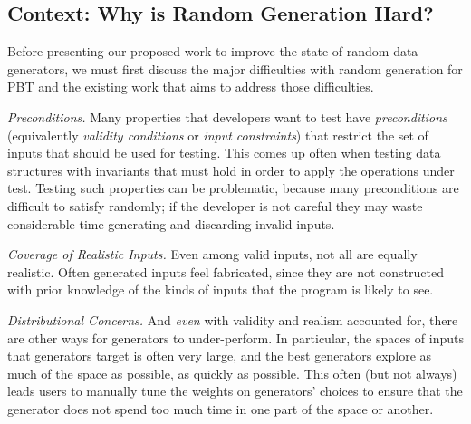 \subsection*{Context: Why is Random Generation Hard?}%
Before presenting our proposed work to improve the state of random data
generators, we must first discuss the major difficulties with random generation
for PBT and the existing work that aims to address those difficulties.


{\em Preconditions.}
Many properties that developers want to test have {\em preconditions}
(equivalently {\em validity conditions} or {\em input constraints}) that
restrict the set of inputs that should be used for testing. This comes up often
when testing data structures with invariants that must hold in order to apply
the operations under test. Testing such properties can be problematic, because
many preconditions are difficult to satisfy randomly; if the developer is not
careful they may waste considerable time generating and discarding invalid inputs.

{\em Coverage of Realistic Inputs.}
Even among valid inputs, not all are equally realistic. Often generated inputs
feel fabricated, since they are not constructed with prior knowledge of the
kinds of inputs that the program is likely to see.

{\em Distributional Concerns.}
And {\em even} with validity and realism accounted for, there are other ways for
generators to under-perform. In particular, the spaces of inputs that generators
target is often very large, and the best generators explore as much of the space
as possible, as quickly as possible. This often (but not always) leads users to manually tune
the weights on generators' choices to ensure that the generator does not spend
too much time in one part of the space or another.


